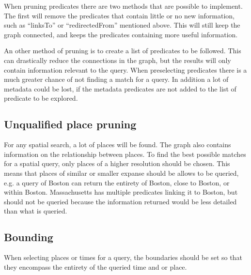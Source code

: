 When pruning predicates there are two methods that are possible to implement. The first will remove the predicates that contain little or no new information, such as ``linksTo'' or ``redirectedFrom'' mentioned above. This will still keep the graph connected, and keeps the predicates containing more useful information.

An other method of pruning is to create a list of predicates to be followed. This can drastically reduce the connections in the graph, but the results will only contain information relevant to the query. When preselecting predicates there is a much greater chance of not finding a match for a query. In addition a lot of metadata could be lost, if the metadata predicates are not added to the list of predicate to be explored.

\subsection{Unqualified place pruning}
For any spatial search, a lot of places will be found. The graph also contains information on the relationship between places. To find the best possible matches for a spatial query, only places of a higher resolution should be chosen. This means that places of similar or smaller expanse should be allows to be queried, e.g. a query of Boston can return the entirety of Boston, close to Boston, or within Boston. Massachusetts has multiple predicates linking it to Boston, but should not be queried because the information returned would be less detailed than what is queried. 

\subsection{Bounding}
When selecting places or times for a query, the boundaries should be set so that they encompass the entirety of the queried time and or place.

\glsresetall

